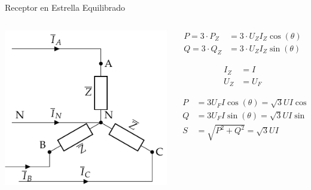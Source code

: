 \documentclass[aspectratio=169, usenames,svgnames,dvipsnames]{beamer}
\begin{document}
\begin{frame}[label={sec:org20f2e03}]{Receptor en Estrella Equilibrado}
\begin{columns}
\begin{column}{0.5\columnwidth}
\begin{center}
\includegraphics[width=.9\linewidth]{../figs/EstrellaEquilibrado_Receptor.pdf}
\end{center}
\end{column}

\begin{column}{0.5\columnwidth}
\begin{align*}
  P = 3 \cdot P_Z &= 3 \cdot U_Z I_Z \cos(\theta)\\
  Q = 3 \cdot Q_Z &= 3 \cdot U_Z I_Z \sin(\theta)
\end{align*}

\begin{align*}
  I_Z &= I\\
  U_Z &= U_F
\end{align*}


\begin{align*}
  P &= 3 U_F I \cos(\theta) = \sqrt{3} U I \cos(\theta)\\
  Q &= 3 U_F I \sin(\theta) = \sqrt{3} U I \sin(\theta)\\
  S &= \sqrt{P^2 + Q^2} =  \sqrt{3} U I
\end{align*}
\end{column}
\end{columns}
\end{frame}
\end{document}
